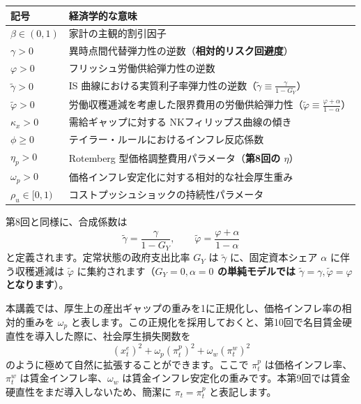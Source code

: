 \documentclass[
  japanese,
  lualatex,
  ja=standard,
  12pt,
  a4paper]{ltjsarticle}
\newcounter{none} %
\begin{document}
{\def\LTcaptype{none} %
\begin{longtable}[]{@{}
  >{\raggedright\arraybackslash}p{}
  >{\raggedright\arraybackslash}p{}@{}}
\toprule\noalign{}
\begin{minipage}[b]{\linewidth}\raggedright
記号
\end{minipage} & \begin{minipage}[b]{\linewidth}\raggedright
経済学的な意味
\end{minipage} \\
\midrule\noalign{}
\endhead
\bottomrule\noalign{}
\endlastfoot
\(\beta\in(0,1)\) & 家計の主観的割引因子 \\
\(\gamma>0\) &
異時点間代替弾力性の逆数（\textbf{相対的リスク回避度}） \\
\(\varphi>0\) & フリッシュ労働供給弾力性の逆数 \\
\(\tilde{\gamma}>0\) & IS
曲線における実質利子率弾力性の逆数（\textbf{\(\tilde{\gamma} \equiv \frac{\gamma}{1-G_Y}\)}） \\
\(\tilde{\varphi}>0\) &
労働収穫逓減を考慮した限界費用の労働供給弾力性（\textbf{\(\tilde{\varphi} \equiv \frac{\varphi+\alpha}{1-\alpha}\)}） \\
\(\kappa_x>0\) & 需給ギャップに対する NKフィリップス曲線の傾き \\
\(\phi\geq0\) & テイラー・ルールにおけるインフレ反応係数 \\
\(\eta_p>0\) & Rotemberg 型価格調整費用パラメータ（\textbf{第8回の
\(\eta\)}） \\
\(\omega_p>0\) & 価格インフレ安定化に対する相対的な社会厚生重み \\
\(\rho_u\in[0,1)\) & コストプッシュショックの持続性パラメータ \\
\end{longtable}
}

第8回と同様に、合成係数は \[
\tilde{\gamma}=\frac{\gamma}{1-G_Y},
\qquad
\tilde{\varphi}=\frac{\varphi+\alpha}{1-\alpha}
\] と定義されます。定常状態の政府支出比率 \(G_Y\) は \(\tilde{\gamma}\)
に、固定資本シェア \(\alpha\) に伴う収穫逓減は \(\tilde{\varphi}\)
に集約されます（\textbf{\(G_Y=0, \alpha=0\) の単純モデルでは
\(\tilde{\gamma}=\gamma, \tilde{\varphi}=\varphi\) となります}）。

本講義では、厚生上の産出ギャップの重みを1に正規化し、価格インフレ率の相対的重みを
\(\omega_p\)
と表します。この正規化を採用しておくと、第10回で名目賃金硬直性を導入した際に、社会厚生損失関数を
\[
\left(x_t^e\right)^2+\omega_p(\pi_t^p)^2+\omega_w(\pi_t^w)^2
\] のように極めて自然に拡張することができます。ここで \(\pi_t^p\)
は価格インフレ率、\(\pi_t^w\) は賃金インフレ率、\(\omega_w\)
は賃金インフレ安定化の重みです。本第9回では賃金硬直性をまだ導入しないため、簡潔に
\(\pi_t = \pi_t^p\) と表記します。
\end{document}
